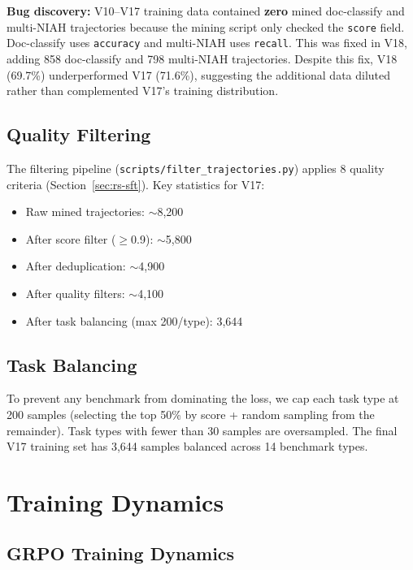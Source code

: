\documentclass{article}
\begin{document}
\textbf{Bug discovery:} V10--V17 training data contained \textbf{zero} mined doc-classify and multi-NIAH trajectories because the mining script only checked the \texttt{score} field. Doc-classify uses \texttt{accuracy} and multi-NIAH uses \texttt{recall}. This was fixed in V18, adding 858 doc-classify and 798 multi-NIAH trajectories. Despite this fix, V18 (69.7\%) underperformed V17 (71.6\%), suggesting the additional data diluted rather than complemented V17's training distribution.

\subsection{Quality Filtering}

The filtering pipeline (\texttt{scripts/filter\_trajectories.py}) applies 8 quality criteria (Section~\ref{sec:rs-sft}). Key statistics for V17:

\begin{itemize}
    \item Raw mined trajectories: $\sim$8,200
    \item After score filter ($\geq$0.9): $\sim$5,800
    \item After deduplication: $\sim$4,900
    \item After quality filters: $\sim$4,100
    \item After task balancing (max 200/type): 3,644
\end{itemize}

\subsection{Task Balancing}

To prevent any benchmark from dominating the loss, we cap each task type at 200 samples (selecting the top 50\% by score + random sampling from the remainder). Task types with fewer than 30 samples are oversampled. The final V17 training set has 3,644 samples balanced across 14 benchmark types.

\section{Training Dynamics}
\label{app:training-dynamics}

\subsection{GRPO Training Dynamics}
\end{document}
